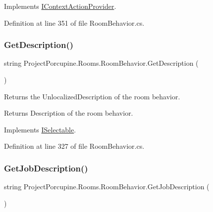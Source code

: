 Implements \hyperlink{interface_i_context_action_provider_acb23b31fd7720af55c607a3c12634d1e}{I\+Context\+Action\+Provider}.



Definition at line 351 of file Room\+Behavior.\+cs.

\mbox{\label{class_project_porcupine_1_1_rooms_1_1_room_behavior_a43beeaa1ce08cced8ee7044e8c97a06d}} 
\subsubsection{\texorpdfstring{Get\+Description()}{GetDescription()}}
{\footnotesize\ttfamily string Project\+Porcupine.\+Rooms.\+Room\+Behavior.\+Get\+Description (\begin{DoxyParamCaption}{ }\end{DoxyParamCaption})}



Returns the Unlocalized\+Description of the room behavior. 

\begin{DoxyReturn}{Returns}
Description of the room behavior.
\end{DoxyReturn}


Implements \hyperlink{interface_i_selectable_a1d8947a443b6214cff01f2d75c8bc75a}{I\+Selectable}.



Definition at line 327 of file Room\+Behavior.\+cs.

\mbox{\label{class_project_porcupine_1_1_rooms_1_1_room_behavior_a56ddca30811b2815ccf9f3c8045ec4cc}} 
\subsubsection{\texorpdfstring{Get\+Job\+Description()}{GetJobDescription()}}
{\footnotesize\ttfamily string Project\+Porcupine.\+Rooms.\+Room\+Behavior.\+Get\+Job\+Description (\begin{DoxyParamCaption}{ }\end{DoxyParamCaption})}



